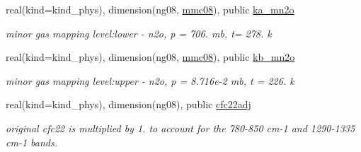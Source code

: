 \begin{Indent}
\begin{DoxyCompactItemize}
real(kind=kind\+\_\+phys), dimension(ng08, \hyperlink{group__module__radlw__kgbnn_ga9e3bfc1880221c18fa07817eb62bcc47}{mmc08}), public \hyperlink{group__module__radlw__kgbnn_ga61949dc331e9a58d4f2a31b625481795}{ka\+\_\+mn2o}
\begin{DoxyCompactList}\small\item\em minor gas mapping level\+:lower -\/ n2o, p = 706. mb, t= 278. k \end{DoxyCompactList}\item 
real(kind=kind\+\_\+phys), dimension(ng08, \hyperlink{group__module__radlw__kgbnn_ga9e3bfc1880221c18fa07817eb62bcc47}{mmc08}), public \hyperlink{group__module__radlw__kgbnn_ga9a8e2f789421acc307e37b03478efb4b}{kb\+\_\+mn2o}
\begin{DoxyCompactList}\small\item\em minor gas mapping level\+:upper -\/ n2o, p = 8.\+716e-\/2 mb, t = 226. k \end{DoxyCompactList}\item 
real(kind=kind\+\_\+phys), dimension(ng08), public \hyperlink{group__module__radlw__kgbnn_ga38a3ce7d8f3db6b732511cf78ef735db}{cfc22adj}
\begin{DoxyCompactList}\small\item\em original cfc22 is multiplied by 1. to account for the 780-\/850 cm-\/1 and 1290-\/1335 cm-\/1 bands. \end{DoxyCompactList}\end{DoxyCompactItemize}
\end{Indent}
